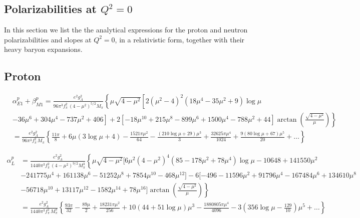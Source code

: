 \documentclass[prc,twocolumn,showpacs,preprintnumbers,amsmath,amssymb
,superscriptaddress,a4paper,nofootinbib
]{revtex4-1}
\begin{document}
\begin{widetext}
\section{Polarizabilities at $Q^2=0$}
\label{App:Polarizabilities}

In this section we list the the analytical expressions for the proton and neutron polarizabilities and slopes at $Q^2=0$, in a relativistic form, together with their heavy baryon expansions.

\subsection{Proton}

\begin{align}
&\alpha_{E1}^p+\beta_{M1}^p = \frac{e^2 g_A^2}{96\pi^3 f_\pi^2\,  (4-\mu^2)^{5/2} M_\pi} \left\{ \mu \sqrt{4-\mu^2} \left[  2 (\mu^2-4)^2(18 \mu^4 -35\mu^2 + 9) \log\mu \right.\right. \nonumber \\
& \left.\left.-36 \mu^6 + 304 \mu^4 - 737 \mu^2+ 406 \right] + 2 \left[-18\mu^{10}+ 215 \mu^8 - 899 \mu^6 + 1500 \mu^4 - 788\mu^2 + 44\right] \arctan\left( \frac{\sqrt{4-\mu^2}}{\mu} \right)\right\} \nonumber \\
& = \frac{e^2 g_A^2}{96\pi^3 f_\pi^2\, M_\pi} \left\{  \frac{11 \pi }{8} + 6 \mu (3 \log \mu +4) - \frac{1521 \pi \mu^2}{64} -\frac{ (210 \log \mu + 29)\mu^3 }{3  } + \frac{ 32625 \pi \mu^4 }{1024 }  + \frac{ 9 (80 \log \mu + 67)\mu^5 }{20  }+\dots\right\}
\end{align}


\begin{align}
\alpha_{L}^p &= \frac{e^2 g_A^2}{1440 \pi^3 f_\pi^2\,  (4-\mu^2)^{9/2} M_\pi^3}\left\{   \mu  \sqrt{4-\mu^2} [ 6 \mu^2 (4-\mu^2)^4 (85 - 178 \mu^2 + 78 \mu^4) \log\mu -10648 + 141550 \mu^2 \nonumber \right.\\
&- 241775 \mu^4 + 161138 \mu^6 -51252 \mu^8 + 7854 \mu^{10} -468 \mu^{12}  ]  - 6 [-496 - 11596  \mu^2 + 91796 \mu^4 -167484 \mu^6 + 134610 \mu^8 \nonumber \\
&\left.-56718 \mu^{10} + 13117 \mu^{12} - 1582 \mu^{14} + 78 \mu^{16}] \arctan\left( \frac{\sqrt{4-\mu^2}}{\mu}\right) \right\}\nonumber\\
&= \frac{e^2 g_A^2}{1440 \pi^3 f_\pi^2\,  M_\pi^3}\left\{ \frac{93 \pi}{32} - \frac{89 \mu}{2} + \frac{18231 \pi \mu^2}{256} +10 (44+ 51 \log\mu )\mu^3 -\frac{1880805 \pi \mu^4}{4096} - 3\left(356 \log\mu -\frac{129}{10}\right)\mu^5 +\dots  \right\}
\end{align}



\end{widetext}
\end{document}
